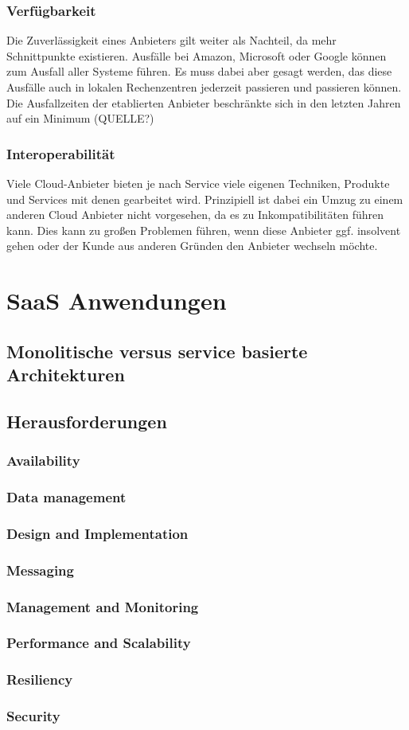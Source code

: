 \subsubsection{Verfügbarkeit}
Die Zuverlässigkeit eines Anbieters gilt weiter als Nachteil, da mehr Schnittpunkte existieren. Ausfälle bei Amazon, Microsoft oder Google können zum Ausfall aller Systeme führen. Es muss dabei aber gesagt werden, das diese Ausfälle auch in lokalen Rechenzentren jederzeit passieren und passieren können. Die Ausfallzeiten der etablierten Anbieter beschränkte sich in den letzten Jahren auf ein Minimum (QUELLE?)

\subsubsection{Interoperabilität}
Viele Cloud-Anbieter bieten je nach Service viele eigenen Techniken, Produkte und Services mit denen gearbeitet wird. Prinzipiell ist dabei ein Umzug zu einem anderen Cloud Anbieter nicht vorgesehen, da es zu Inkompatibilitäten führen kann. Dies kann zu großen Problemen führen, wenn diese Anbieter ggf. insolvent gehen oder der Kunde aus anderen Gründen den Anbieter wechseln möchte. 

\section{SaaS Anwendungen}
\subsection{Monolitische versus service basierte Architekturen}
\subsection{Herausforderungen}
\subsubsection{Availability}
\subsubsection{Data management}
\subsubsection{Design and Implementation}
\subsubsection{Messaging}
\subsubsection{Management and Monitoring}
\subsubsection{Performance and Scalability}
\subsubsection{Resiliency}
\subsubsection{Security}


